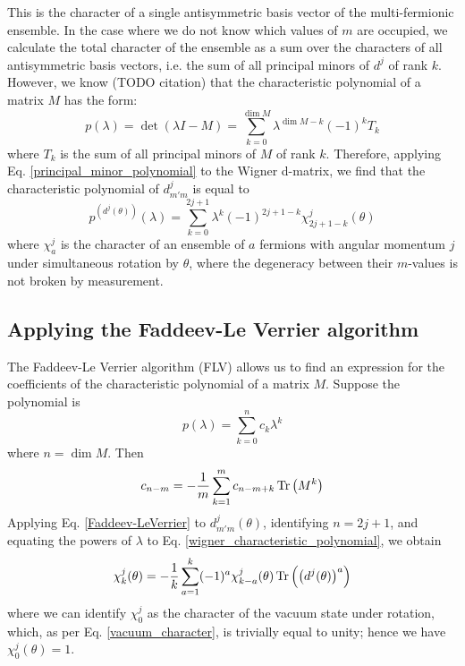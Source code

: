 \documentclass[12pt]{article}
\begin{document}
	This is the character of a single antisymmetric basis vector of the multi-fermionic ensemble. In the case where we do not know which values of $m$ are occupied, we calculate the total character of the ensemble as a sum over the characters of all antisymmetric basis vectors, i.e. the sum of all principal minors of $d^j$ of rank $k$. However, we know (TODO citation) that the characteristic polynomial of a matrix $M$ has the form:
	\begin{equation} \label{principal_minor_polynomial}
	p(\lambda)=\det(\lambda I - M) = \sum_{k=0}^{\dim M}\lambda^{\dim M-k}(-1)^k T_k
	\end{equation}
	where $T_k$ is the sum of all principal minors of $M$ of rank $k$. Therefore, applying Eq. \ref{principal_minor_polynomial} to the Wigner d-matrix, we find that the characteristic polynomial of $d^j_{m'm}$ is equal to
	\begin{equation} \label{wigner_characteristic_polynomial}
	p^{\left(d^j(\theta)\right)}(\lambda) = \sum_{k=0}^{2j+1}\lambda^{k}(-1)^{2j+1-k} \chi^j_{2j+1-k}(\theta)
	\end{equation}
	where $\chi^j_a$ is the character of an ensemble of $a$ fermions with angular momentum $j$ under simultaneous rotation by $\theta$, where the degeneracy between their $m$-values is not broken by measurement.
	
	\subsection{Applying the Faddeev-Le Verrier algorithm}
	The Faddeev-Le Verrier algorithm (FLV) allows us to find an expression for the coefficients of the characteristic polynomial of a matrix $M$. Suppose the polynomial is
	$$p(\lambda)=\sum_{k=0}^n c_k \lambda^k$$
	where $n=\dim M$. Then
	\begin{equation} \label{Faddeev-LeVerrier}
	c_{n-m} = -\frac{1}{m}\sum_{k=1}^m c_{n-m+k} \Tr\left(M^k\right)
	\end{equation}
	Applying Eq. \ref{Faddeev-LeVerrier} to $d^j_{m'm}(\theta)$, identifying $n=2j+1$, and equating the powers of $\lambda$ to Eq. \ref{wigner_characteristic_polynomial}, we obtain
	\begin{equation} \label{FLV_with_matrix_powers}
	\chi^j_k(\theta)=-\frac{1}{k}\sum_{a=1}^k (-1)^{a}\chi^j_{k-a}(\theta)\Tr\left(\left(d^j(\theta)\right)^a\right)
	\end{equation}
	where we can identify $\chi^j_0$ as the character of the vacuum state under rotation, which, as per Eq. \ref{vacuum_character}, is trivially equal to unity; hence we have $\chi^j_0(\theta)=1$.
	
\end{document}
